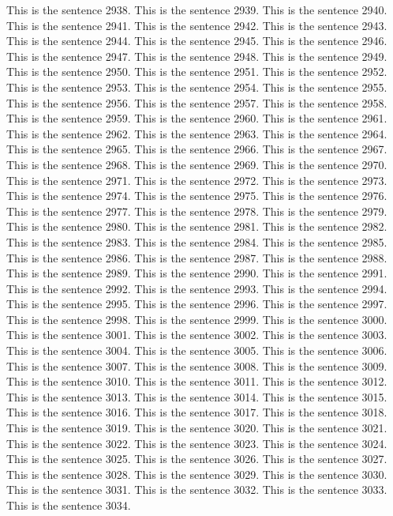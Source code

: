 \documentclass{article}
\begin{document}
This is the sentence 2938.
This is the sentence 2939.
This is the sentence 2940.
This is the sentence 2941.
This is the sentence 2942.
This is the sentence 2943.
This is the sentence 2944.
This is the sentence 2945.
This is the sentence 2946.
This is the sentence 2947.
This is the sentence 2948.
This is the sentence 2949.
This is the sentence 2950.
This is the sentence 2951.
This is the sentence 2952.
This is the sentence 2953.
This is the sentence 2954.
This is the sentence 2955.
This is the sentence 2956.
This is the sentence 2957.
This is the sentence 2958.
This is the sentence 2959.
This is the sentence 2960.
This is the sentence 2961.
This is the sentence 2962.
This is the sentence 2963.
This is the sentence 2964.
This is the sentence 2965.
This is the sentence 2966.
This is the sentence 2967.
This is the sentence 2968.
This is the sentence 2969.
This is the sentence 2970.
This is the sentence 2971.
This is the sentence 2972.
This is the sentence 2973.
This is the sentence 2974.
This is the sentence 2975.
This is the sentence 2976.
This is the sentence 2977.
This is the sentence 2978.
This is the sentence 2979.
This is the sentence 2980.
This is the sentence 2981.
This is the sentence 2982.
This is the sentence 2983.
This is the sentence 2984.
This is the sentence 2985.
This is the sentence 2986.
This is the sentence 2987.
This is the sentence 2988.
This is the sentence 2989.
This is the sentence 2990.
This is the sentence 2991.
This is the sentence 2992.
This is the sentence 2993.
This is the sentence 2994.
This is the sentence 2995.
This is the sentence 2996.
This is the sentence 2997.
This is the sentence 2998.
This is the sentence 2999.
This is the sentence 3000.
This is the sentence 3001.
This is the sentence 3002.
This is the sentence 3003.
This is the sentence 3004.
This is the sentence 3005.
This is the sentence 3006.
This is the sentence 3007.
This is the sentence 3008.
This is the sentence 3009.
This is the sentence 3010.
This is the sentence 3011.
This is the sentence 3012.
This is the sentence 3013.
This is the sentence 3014.
This is the sentence 3015.
This is the sentence 3016.
This is the sentence 3017.
This is the sentence 3018.
This is the sentence 3019.
This is the sentence 3020.
This is the sentence 3021.
This is the sentence 3022.
This is the sentence 3023.
This is the sentence 3024.
This is the sentence 3025.
This is the sentence 3026.
This is the sentence 3027.
This is the sentence 3028.
This is the sentence 3029.
This is the sentence 3030.
This is the sentence 3031.
This is the sentence 3032.
This is the sentence 3033.
This is the sentence 3034.
\end{document}
